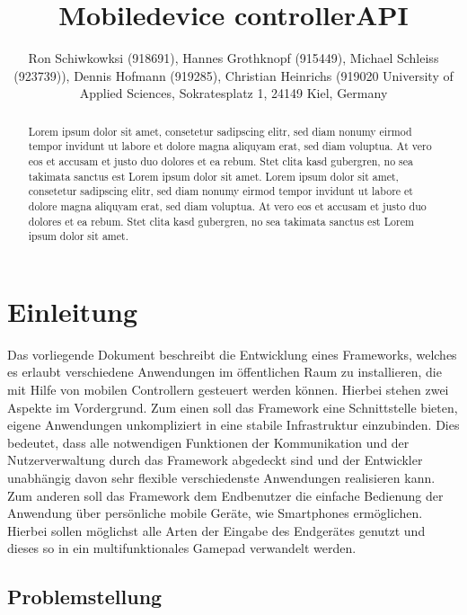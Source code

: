 \documentclass[a4paper]{spie}  %
\title{Mobiledevice controllerAPI} %
\author{ Ron Schiwkowksi  (918691), Hannes Grothknopf (915449), Michael Schleiss (923739)), Dennis Hofmann (919285), Christian Heinrichs (919020
\skiplinehalf
University of Applied Sciences, Sokratesplatz 1, 24149 Kiel, Germany
}
\begin{document}
 
  \maketitle 
\begin{abstract} %
Lorem ipsum dolor sit amet, consetetur sadipscing elitr, sed diam nonumy eirmod tempor invidunt ut labore et dolore magna aliquyam erat, sed diam voluptua. At vero eos et accusam et justo duo dolores et ea rebum. Stet clita kasd gubergren, no sea takimata sanctus est Lorem ipsum dolor sit amet. Lorem ipsum dolor sit amet, consetetur sadipscing elitr, sed diam nonumy eirmod tempor invidunt ut labore et dolore magna aliquyam erat, sed diam voluptua. At vero eos et accusam et justo duo dolores et ea rebum. Stet clita kasd gubergren, no sea takimata sanctus est Lorem ipsum dolor sit amet.
\end{abstract}


\section{Einleitung} %
Das vorliegende Dokument beschreibt die Entwicklung eines Frameworks, welches es erlaubt verschiedene Anwendungen im öffentlichen Raum zu installieren, die mit Hilfe von mobilen Controllern gesteuert werden können. Hierbei stehen zwei Aspekte im Vordergrund. Zum einen soll das Framework eine Schnittstelle bieten, eigene Anwendungen unkompliziert in eine stabile Infrastruktur einzubinden. Dies bedeutet, dass alle notwendigen Funktionen der Kommunikation und der Nutzerverwaltung durch das Framework abgedeckt sind und der Entwickler unabhängig davon sehr flexible verschiedenste Anwendungen realisieren kann. Zum anderen soll das Framework dem Endbenutzer die einfache Bedienung der Anwendung über persönliche mobile Geräte, wie Smartphones ermöglichen. Hierbei sollen möglichst alle Arten der Eingabe des Endgerätes genutzt und dieses so in ein multifunktionales Gamepad verwandelt werden.

\subsection{Problemstellung}
\end{document}
